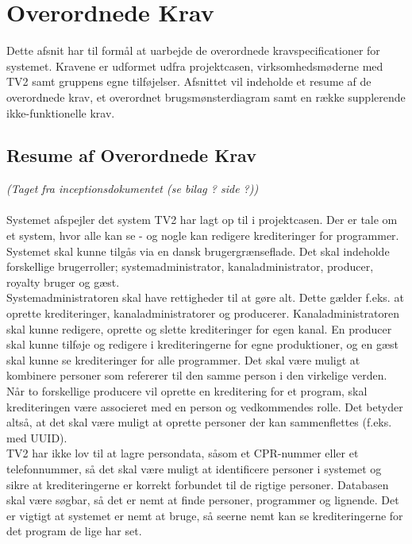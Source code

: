 \section{Overordnede Krav}
\noindent
Dette afsnit har til formål at uarbejde de overordnede kravspecificationer for systemet. Kravene er udformet udfra projektcasen, virksomhedsmøderne med TV2 samt gruppens egne tilføjelser.
Afsnittet vil indeholde et resume af de overordnede krav, et overordnet brugsmønsterdiagram samt en række supplerende ikke-funktionelle krav.

\subsection{Resume af Overordnede Krav} 

\textit{(Taget fra inceptionsdokumentet (se bilag ? side ?))}\\ \\
\noindent
Systemet afspejler det system TV2 har lagt op til i projektcasen. Der er tale om et system, hvor alle kan se - og nogle kan redigere krediteringer for programmer. Systemet skal kunne tilgås via en dansk brugergrænseflade. Det skal indeholde forskellige brugerroller; systemadministrator, kanaladministrator, producer, royalty bruger og gæst.\\

\noindent
Systemadministratoren skal have rettigheder til at gøre alt. Dette gælder f.eks. at oprette krediteringer, kanaladministratorer og producerer. Kanaladministratoren skal kunne redigere, oprette og slette krediteringer for egen kanal. En producer skal kunne tilføje og redigere i krediteringerne for egne produktioner, og en gæst skal kunne se krediteringer for alle programmer. 
Det skal være muligt at kombinere personer som refererer til den samme person i den virkelige verden. Når to forskellige producere vil oprette en kreditering for et program, skal krediteringen være associeret med en person og vedkommendes rolle. Det betyder altså, at det skal være muligt at oprette personer der kan sammenflettes (f.eks. med UUID).\\

\noindent
TV2 har ikke lov til at lagre persondata, såsom et CPR-nummer eller et telefonnummer, så det skal være muligt at identificere personer i systemet og sikre at krediteringerne er korrekt forbundet til de rigtige personer.
Databasen skal være søgbar, så det er nemt at finde personer, programmer og lignende. Det er vigtigt at systemet er nemt at bruge, så seerne nemt kan se krediteringerne for det program de lige har set.\\

